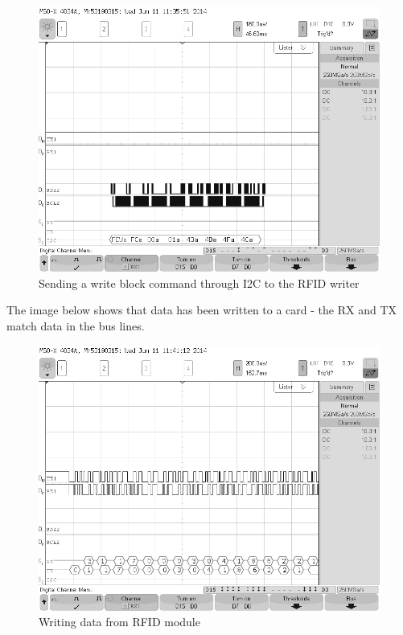 \documentclass[12pt]{article} %
\begin{document}
	\begin{figure}[H]
		\centering
		\includegraphics[width=\textwidth]{images/scopeimages/cardwriteblockI2C.png}
		\caption{Sending a write block command through I2C to the RFID writer}
		\label{fig:write1}
	\end{figure}
	
	The image below shows that data has been written to a card - the RX and TX match data in the bus lines.
	
	\begin{figure}[H]
		\centering
		\includegraphics[width=\textwidth]{images/scopeimages/cardwriteRFID.png}
		\caption{Writing data from RFID module}
		\label{fig:write2}
	\end{figure}
\end{document}
